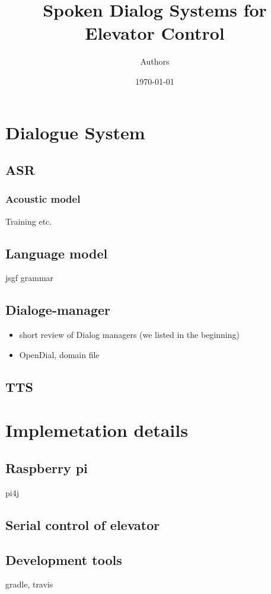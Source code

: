 \documentclass[11pt]{article}
\title{Spoken Dialog Systems for Elevator Control}
\author{Authors}
\date{\today}
\begin{document}
\maketitle


\section*{Dialogue System}
\subsection*{ASR}
\subsubsection*{Acoustic model}
Training etc.
\subsection*{Language model}
jsgf grammar
\subsection*{Dialoge-manager}
\begin{itemize}
\item
short review of Dialog managers (we listed in the beginning)
\item 
OpenDial, domain file
\end{itemize}
\subsection*{TTS}

\section*{Implemetation details}
\subsection*{Raspberry pi}
pi4j
\subsection*{Serial control of elevator}
\subsection*{Development tools}
gradle, travis
\end{document}
